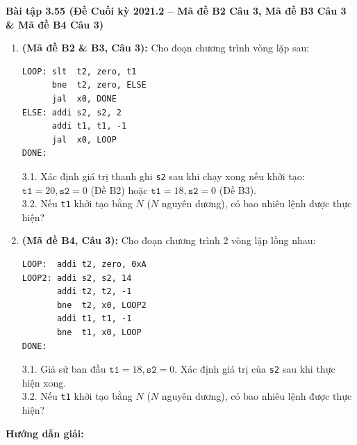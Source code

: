 \textbf{Bài tập 3.55 (Đề Cuối kỳ 2021.2 -- Mã đề B2 Câu 3, Mã đề B3 Câu 3 \& Mã đề B4 Câu 3)}
\begin{enumerate}[label=\alph*)]
    \item \textbf{(Mã đề B2 \& B3, Câu 3):} Cho đoạn chương trình vòng lặp sau:

\noindent\begin{minipage}{\linewidth}
\begin{lstlisting}
LOOP: slt  t2, zero, t1
      bne  t2, zero, ELSE
      jal  x0, DONE
ELSE: addi s2, s2, 2
      addi t1, t1, -1
      jal  x0, LOOP
DONE:
\end{lstlisting}
\end{minipage}

    3.1. Xác định giá trị thanh ghi \texttt{s2} sau khi chạy xong nếu khởi tạo: $\texttt{t1} = 20, \texttt{s2} = 0$ (Đề B2) hoặc $\texttt{t1} = 18, \texttt{s2} = 0$ (Đề B3).\\
    3.2. Nếu \texttt{t1} khởi tạo bằng $N$ ($N$ nguyên dương), có bao nhiêu lệnh được thực hiện?
    \item \textbf{(Mã đề B4, Câu 3):} Cho đoạn chương trình 2 vòng lặp lồng nhau:

\noindent\begin{minipage}{\linewidth}
\begin{lstlisting}
LOOP:  addi t2, zero, 0xA
LOOP2: addi s2, s2, 14
       addi t2, t2, -1
       bne  t2, x0, LOOP2
       addi t1, t1, -1
       bne  t1, x0, LOOP
DONE:
\end{lstlisting}
\end{minipage}

    3.1. Giả sử ban đầu $\texttt{t1} = 18, \texttt{s2} = 0$. Xác định giá trị của \texttt{s2} sau khi thực hiện xong.\\
    3.2. Nếu \texttt{t1} khởi tạo bằng $N$ ($N$ nguyên dương), có bao nhiêu lệnh được thực hiện?
\end{enumerate}
\textbf{Hướng dẫn giải:}
